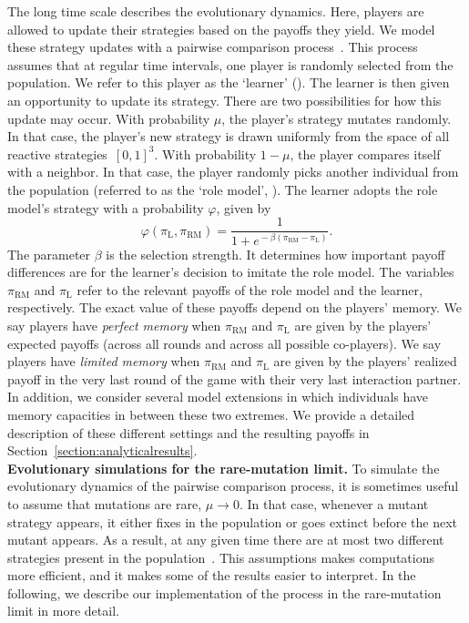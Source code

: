 \documentclass[11pt]{article}
\def\rolemodel{\text{RM}}
\def\learner{\text{L}}
\theoremstyle{plainCl1}
\theoremstyle{plainCl2}
\begin{document}
The long time scale describes the evolutionary dynamics. 
Here, players are allowed to update their strategies based on the payoffs they yield. 
We model these strategy updates with a pairwise comparison process~\citep{traulsen2007pairwise}.
This process assumes that at regular time intervals, one player is randomly selected from the population.
We refer to this player as the `learner' (\learner). 
The learner is then given an opportunity to update its strategy. 
There are two possibilities for how this update may occur. 
With probability $\mu$, the player's strategy mutates randomly. 
In that case, the player's new strategy is drawn uniformly from the space of all reactive strategies~$[0,1]^3$.  
With probability $1\!-\!\mu$, the player compares itself with a neighbor. 
In that case, the player randomly picks another individual from the population (referred to as the `role model', \rolemodel). 
The learner adopts the role model's strategy with a probability \(\varphi\), given by
\begin{equation} \label{Eq:rho}
    \varphi(\pi_{\learner}, \pi_{\rolemodel}) = \frac{1}{1\!+\! e^{\!-\!\beta (\pi_\rolemodel - \pi_\learner)}}.
\end{equation}
The parameter \(\beta\) is the selection strength.
It determines how important payoff differences are for the learner's decision to imitate the role model. 
The variables $\pi_\rolemodel$ and $\pi_\learner$ refer to the relevant payoffs of the role model and the learner, respectively. 
The exact value of these payoffs depend on the players' memory. 
We say players have {\it perfect memory} when $\pi_\rolemodel$ and $\pi_\learner$ are given by the players' expected payoffs (across all rounds and across all possible co-players). 
We say players have {\it limited memory} when $\pi_\rolemodel$ and $\pi_\learner$ are given by the players' realized payoff in the very last round of the game with their very last interaction partner. 
In addition, we consider several model extensions in which individuals have memory capacities in between these two extremes. 
We provide a detailed description of these different settings and the resulting payoffs in Section~\ref{section:analyticalresults}.\\


\noindent
{\bf Evolutionary simulations for the rare-mutation limit.} 
To simulate the evolutionary dynamics of the pairwise comparison process, it is sometimes useful to assume that mutations are rare, $\mu\!\rightarrow\!0$. 
In that case, whenever a mutant strategy appears, it either fixes in the population or goes extinct before the next mutant appears. 
As a result, at any given time there are at most two different strategies present in the population~\citep{fudenberg:JET:2006,wu:JMB:2012,mcavoy:jet:2015}. 
This assumptions makes computations more efficient, and it makes some of the results easier to interpret.
In the following, we describe our implementation of the process in the rare-mutation limit in more detail. 
\end{document}
